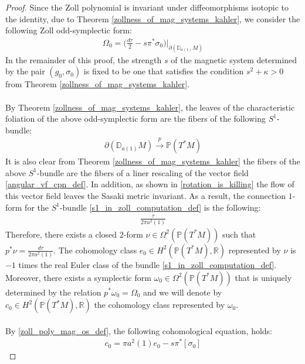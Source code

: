 \documentclass[11pt]{amsart}
\theoremstyle{plain}
\theoremstyle{definition}
\theoremstyle{remark}
\begin{document}
\begin{proof}
Since the Zoll polynomial is invariant under diffeomorphisms isotopic to the identity, due to Theorem \ref{zollness_of_mag_systems_kahler}, we consider the following Zoll odd-symplectic form:
\begin{align}\label{zoll_poly_mag_os_def}
    \Omega_0 = \bigg(\frac{d\tau}{2} - s\pi^*\sigma_0 \bigg) \bigg|_{\partial(\mathbb{D}_{a(1)}M)}
\end{align}
In the remainder of this proof, the strength $s$ of the magnetic system determined by the pair $(g_0,\sigma_0)$ is fixed to be one that satisfies the condition $s^2+\kappa>0$ from Theorem \ref{zollness_of_mag_systems_kahler}.\\
\\
By Theorem \ref{zollness_of_mag_systems_kahler}, the leaves of the characteristic foliation of the above odd-symplectic form are the fibers of the following $S^1$-bundle:
\begin{align}\label{s1_in_zoll_computation_def}
    \partial(\mathbb{D}_{a(1)}M) \xrightarrow{p} \mathbb{P}(T^*M)
\end{align}
It is also clear from Theorem \ref{zollness_of_mag_systems_kahler} the fibers of the above 
$S^1$-bundle are the fibers of a liner rescaling of the vector field \eqref{angular_vf_cpn_def}. In addition, as shown in \eqref{rotation_is_killing} the flow of this vector field leaves the Sasaki metric invariant. As a result, the connection $1$-form for the $S^1$-bundle \eqref{s1_in_zoll_computation_def} is the following:
\begin{align}
    \frac{\tau}{2\pi a^2(1)}
\end{align}
Therefore, there exists a closed $2$-form $\nu \in \Omega^2(\mathbb{P}(T^*M))$ such that $p^*\nu =  \frac{d\tau}{2\pi a^2(1)}$. The cohomology class $e_0 \in H^2(\mathbb{P}(T^*M), \mathbb{R})$ represented by $\nu$ is $-1$ times the real Euler class of the bundle \eqref{s1_in_zoll_computation_def}. Moreover, there exists a symplectic form $\omega_0 \in \Omega^2(\mathbb{P}(T^*M))$ that is uniquely determined by the relation $p^*\omega_0 = \Omega_0$ and we will denote by $c_0 \in H^2(\mathbb{P}(T^*M), \mathbb{R})$ the cohomology class represented by $\omega_0$.\\
\\
By \eqref{zoll_poly_mag_os_def}, the following cohomological equation, holds:
\begin{align}\label{c_0_cpn_1}
    c_0 = \pi a^2(1) e_0-{s}\pi^*[\sigma_{0}]
\end{align}

\end{proof}
\end{document}
